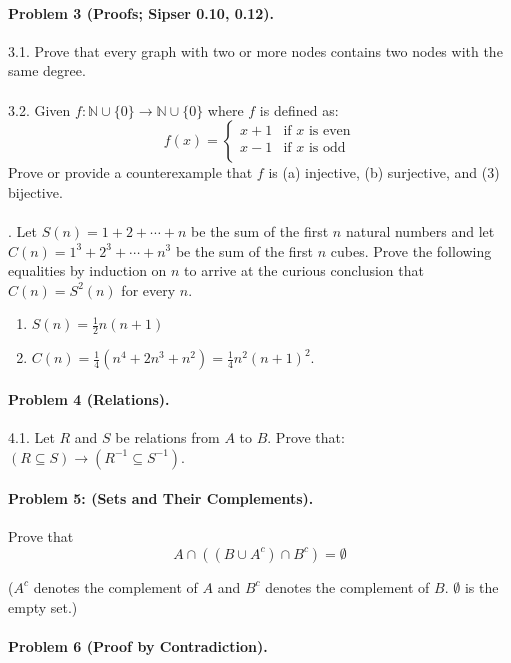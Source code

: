 \documentclass[letterpaper,11pt,twoside]{article}
\theoremstyle{plain}
\theoremstyle{definition}
\theoremstyle{remark}
\theoremstyle{restate}
\begin{document}
\paragraph{Problem 3 (Proofs; Sipser 0.10, 0.12).}

3.1. Prove that every graph with two or more nodes contains two nodes with the same degree.\\
\\
3.2. Given $f:\mathbb{N} \cup \{0\} \rightarrow \mathbb{N} \cup \{0\}$ where $f$ is defined as: \\
    \[f(x)=
        \begin{cases}
        x+1 & \text{if } x \text{ is even} \\
        x-1 & \text{if } x \text{ is odd} \\
    \end{cases}\]
Prove or provide a counterexample that $f$ is (a) injective, (b) surjective, and (3) bijective. \\ \\
. Let $S(n) = 1 + 2 + \cdots + n$ be the sum of the first $n$ natural numbers and let $C(n) = 1^3 + 2^3 + \cdots + n^3$ be the sum of the first $n$ cubes. Prove the following equalities by induction on $n$ to arrive at the curious conclusion that $C(n) = S^2(n)$ for every $n$.
\begin{enumerate}
    \item $S(n) = \frac{1}{2} n (n+1)$
    \item $C(n) = \frac{1}{4}(n^4 + 2n^3 + n^2) = \frac{1}{4}n^2(n+1)^2$.
\end{enumerate} 


\paragraph{Problem 4 (Relations).}

4.1. Let $R$ and $S$ be relations from $A$ to $B$. Prove that: $(R \subseteq S) \rightarrow (R^{-1} \subseteq S^{-1})$.

\paragraph{Problem 5: (Sets and Their Complements).}

Prove that
$$A \cap ((B \cup A^c) \cap B^c ) = \emptyset$$

($A^c$ denotes the complement of $A$ and $B^c$ denotes the complement of $B$.  $\emptyset$ is the empty set.)

\paragraph{Problem 6 (Proof by Contradiction). }
\end{document}
